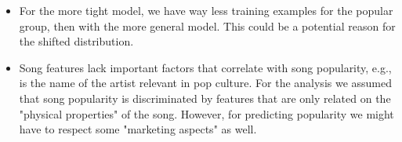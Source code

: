 \documentclass{article}
\begin{document}
\begin{itemize}
  \item For the more tight model, we have way less training examples for the popular group, then with the more general model. This could be a potential reason for the shifted distribution.
  \item Song features lack important factors that correlate with song popularity, e.g., is the name of the artist relevant in pop culture. For the analysis we assumed that song popularity is discriminated by features that are only related on the "physical properties" of the song. However, for predicting popularity we might have to respect some "marketing aspects" as well. 
\end{itemize}


% 

\end{document}
